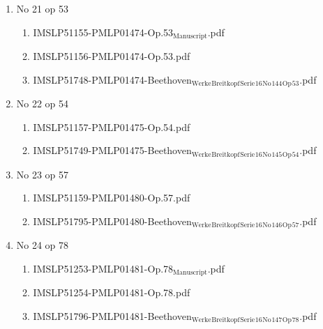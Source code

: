 \documentclass[11pt]{article}
\begin{document}
\begin{enumerate}
\begin{enumerate}
\begin{enumerate}
\item No 21 op 53
\label{sec-1-1-1-1-44-9-6-8-58}
\begin{enumerate}
\item IMSLP51155-PMLP01474-Op.53$_{\text{Manuscript}}$.pdf
\label{sec-1-1-1-1-44-9-6-8-58-1}

\item IMSLP51156-PMLP01474-Op.53.pdf
\label{sec-1-1-1-1-44-9-6-8-58-2}

\item IMSLP51748-PMLP01474-Beethoven$_{\text{Werke}}$$_{\text{Breitkopf}}$$_{\text{Serie}}$$_{\text{16}}$$_{\text{No}}$$_{\text{144}}$$_{\text{Op}}$$_{\text{53}}$.pdf
\label{sec-1-1-1-1-44-9-6-8-58-3}
\end{enumerate}

\item No 22 op 54
\label{sec-1-1-1-1-44-9-6-8-59}
\begin{enumerate}
\item IMSLP51157-PMLP01475-Op.54.pdf
\label{sec-1-1-1-1-44-9-6-8-59-1}

\item IMSLP51749-PMLP01475-Beethoven$_{\text{Werke}}$$_{\text{Breitkopf}}$$_{\text{Serie}}$$_{\text{16}}$$_{\text{No}}$$_{\text{145}}$$_{\text{Op}}$$_{\text{54}}$.pdf
\label{sec-1-1-1-1-44-9-6-8-59-2}
\end{enumerate}

\item No 23 op 57
\label{sec-1-1-1-1-44-9-6-8-60}
\begin{enumerate}
\item IMSLP51159-PMLP01480-Op.57.pdf
\label{sec-1-1-1-1-44-9-6-8-60-1}

\item IMSLP51795-PMLP01480-Beethoven$_{\text{Werke}}$$_{\text{Breitkopf}}$$_{\text{Serie}}$$_{\text{16}}$$_{\text{No}}$$_{\text{146}}$$_{\text{Op}}$$_{\text{57}}$.pdf
\label{sec-1-1-1-1-44-9-6-8-60-2}
\end{enumerate}

\item No 24 op 78
\label{sec-1-1-1-1-44-9-6-8-61}
\begin{enumerate}
\item IMSLP51253-PMLP01481-Op.78$_{\text{Manuscript}}$.pdf
\label{sec-1-1-1-1-44-9-6-8-61-1}

\item IMSLP51254-PMLP01481-Op.78.pdf
\label{sec-1-1-1-1-44-9-6-8-61-2}

\item IMSLP51796-PMLP01481-Beethoven$_{\text{Werke}}$$_{\text{Breitkopf}}$$_{\text{Serie}}$$_{\text{16}}$$_{\text{No}}$$_{\text{147}}$$_{\text{Op}}$$_{\text{78}}$.pdf
\label{sec-1-1-1-1-44-9-6-8-61-3}
\end{enumerate}


\end{enumerate}
\end{enumerate}
\end{enumerate}
\end{document}
